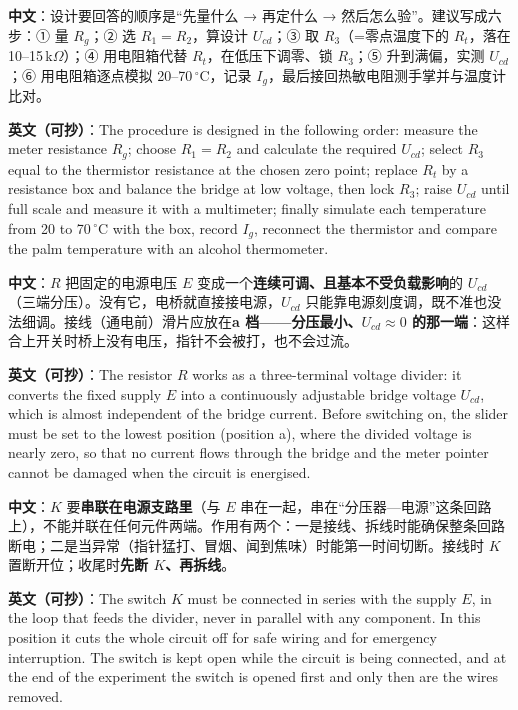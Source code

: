 \documentclass[11pt]{ctexart}
\newcommand{\degC}{\ensuremath{\,^\circ\mathrm{C}}}
\begin{document}

\textbf{中文}：设计要回答的顺序是“先量什么 → 再定什么 → 然后怎么验”。建议写成六步：① 量 $R_g$；② 选 $R_1=R_2$，算设计 $U_{cd}$；③ 取 $R_3$（=零点温度下的 $R_t$，落在 10--15\,k$\Omega$）；④ 用电阻箱代替 $R_t$，在低压下调零、锁 $R_3$；⑤ 升到满偏，实测 $U_{cd}$；⑥ 用电阻箱逐点模拟 20--70\degC，记录 $I_g$，最后接回热敏电阻测手掌并与温度计比对。

\textbf{英文（可抄）}：The procedure is designed in the following order: measure the meter resistance $R_g$; choose $R_1=R_2$ and calculate the required $U_{cd}$; select $R_3$ equal to the thermistor resistance at the chosen zero point; replace $R_t$ by a resistance box and balance the bridge at low voltage, then lock $R_3$; raise $U_{cd}$ until full scale and measure it with a multimeter; finally simulate each temperature from 20 to 70\,$^{\circ}$C with the box, record $I_g$, reconnect the thermistor and compare the palm temperature with an alcohol thermometer.


\textbf{中文}：$R$ 把固定的电源电压 $E$ 变成一个\textbf{连续可调、且基本不受负载影响}的 $U_{cd}$（三端分压）。没有它，电桥就直接接电源，$U_{cd}$ 只能靠电源刻度调，既不准也没法细调。接线（通电前）滑片应放在\textbf{a 档——分压最小、$U_{cd}\approx0$ 的那一端}：这样合上开关时桥上没有电压，指针不会被打，也不会过流。

\textbf{英文（可抄）}：The resistor $R$ works as a three-terminal voltage divider: it converts the fixed supply $E$ into a continuously adjustable bridge voltage $U_{cd}$, which is almost independent of the bridge current. Before switching on, the slider must be set to the lowest position (position a), where the divided voltage is nearly zero, so that no current flows through the bridge and the meter pointer cannot be damaged when the circuit is energised.


\textbf{中文}：$K$ 要\textbf{串联在电源支路里}（与 $E$ 串在一起，串在“分压器—电源”这条回路上），不能并联在任何元件两端。作用有两个：一是接线、拆线时能确保整条回路断电；二是当异常（指针猛打、冒烟、闻到焦味）时能第一时间切断。接线时 $K$ 置断开位；收尾时\textbf{先断 $K$、再拆线}。

\textbf{英文（可抄）}：The switch $K$ must be connected in series with the supply $E$, in the loop that feeds the divider, never in parallel with any component. In this position it cuts the whole circuit off for safe wiring and for emergency interruption. The switch is kept open while the circuit is being connected, and at the end of the experiment the switch is opened first and only then are the wires removed.
\end{document}
